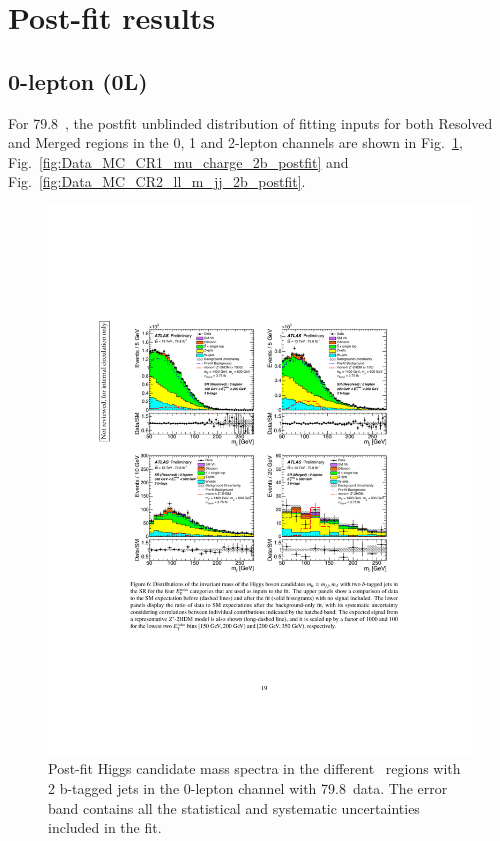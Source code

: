 \section{Post-fit results}
\subsection{0-lepton (0L)}

\par For 79.8~\ifb, the postfit unblinded distribution of fitting inputs for both Resolved and Merged regions in the 0, 1 and 2-lepton channels are shown in Fig.~\ref{fig:Data_MC_SR_m_jj_2b_postfit}, 
Fig.~\ref{fig:Data_MC_CR1_mu_charge_2b_postfit} and Fig.~\ref{fig:Data_MC_CR2_ll_m_jj_2b_postfit}.

\begin{figure}[H]
    \includegraphics[width=15cm, trim={4cm 9cm 4cm 6cm}, clip]{chapters/c9/figures/post-fit-0lep.pdf}

  \caption{Post-fit Higgs candidate mass spectra in the different \met~regions with \\2 b-tagged jets in the 0-lepton channel with 79.8~\ifb data. The error band contains all the statistical and systematic uncertainties included in the fit.}
  \label{fig:Data_MC_SR_m_jj_2b_postfit}
  \end{figure}
  
